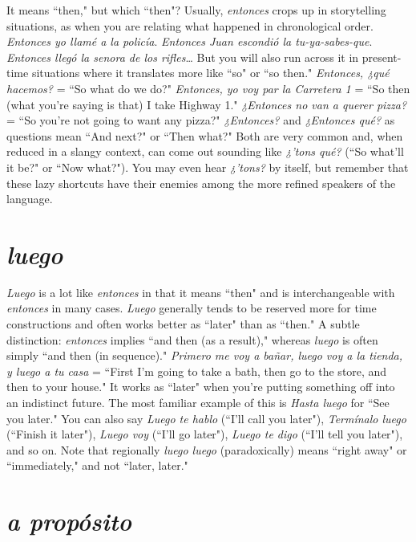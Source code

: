 It means ``then," but which ``then"? Usually, \emph{entonces} crops
up in storytelling situations, as when you are relating what happened
in chronological order. \emph{Entonces yo llamé a la policía}. \emph{Entonces Juan
escondió la tu-ya-sabes-que}. \emph{Entonces llegó la senora de los rifles}\ldots{}
But you will also run across it in present-time situations where it
translates more like ``so" or ``so then." \emph{Entonces, ¿qué hacemos?} = ``So
what do we do?" \emph{Entonces, yo voy par la Carretera 1} = ``So then (what
you're saying is that) I take Highway 1." \emph{¿Entonces no van a querer
pizza?} = ``So you're not going to want any pizza?" \emph{¿Entonces?} and \emph{¿Entonces qué?} as questions mean ``And next?" or ``Then what?" Both are
very common and, when reduced in a slangy context, can come out
sounding like \emph{¿'tons qué?} (``So what'll it be?" or ``Now what?").
You
may even hear \emph{¿'tons?} by itself, but remember that these lazy shortcuts
have their enemies among the more refined speakers of the language.

\section{\emph{luego}}

\emph{Luego} is a lot like \emph{entonces} in that it means ``then" and is interchangeable with \emph{entonces} in many cases. \emph{Luego} generally tends
to be reserved more for time constructions and often works better as
``later" than as ``then." A subtle distinction: \emph{entonces} implies ``and
then (as a result)," whereas \emph{luego} is often simply ``and then (in sequence)." \emph{Primero me voy a bañar, luego voy a la tienda, y luego a tu
casa} = ``First I'm going to take a bath, then go to the store, and then
to your house." It works as ``later" when you're putting something off
into an indistinct future. The most familiar example of this is \emph{Hasta
luego} for ``See you later." You can also say \emph{Luego te hablo} (``I'll call
you later"), \emph{Termínalo luego} (``Finish it later"), \emph{Luego voy} (``I'll go
later"), \emph{Luego te digo} (``I'll tell you later"), and so on. Note that regionally \emph{luego luego} (paradoxically) means ``right away" or ``immediately,"
and not ``later, later."

\section{\emph{a propósito}}

